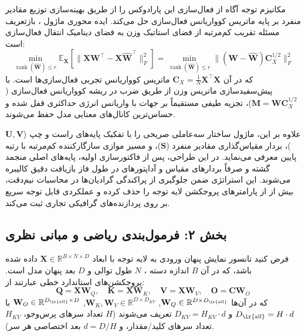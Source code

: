 مکانیزم توجه آگاه از فعال‌سازی  این پارادوکس را از طریق بهینه‌سازی توزیع مقادیر منفرد بر پایه ماتریس کوواریانس فعال‌سازی حل می‌کند. ایده محوری ماژول ، بازتعریف مسئله تقریب کم‌مرتبه از فضای استاتیک وزن به فضای دینامیک انتقال فعال‌سازی است:
\begin{equation}
\min_{\operatorname{rank}(\hat{\mathbf{W}}) \le r} \mathbb{E}_{\mathbf{X}}\left[ \|\mathbf{X}\mathbf{W}^\top - \mathbf{X}\hat{\mathbf{W}}^\top\|_F^2 \right] = \min_{\operatorname{rank}(\hat{\mathbf{W}}) \le r} \|(\mathbf{W} - \hat{\mathbf{W}})\mathbf{C}_X^{1/2}\|_F^2
\end{equation}
که در آن $\mathbf{C}_X = \frac{1}{N}\mathbf{X}^\top \mathbf{X}$ ماتریس کوواریانس تجربی فعال‌سازی‌ها است. با پیش‌سفیدسازی  ماتریس وزن از طریق ضرب در ریشه کوواریانس فعال‌سازی ($\mathbf{M} = \mathbf{W}\mathbf{C}_X^{1/2}$)، تجزیه طیفی مستقیماً بر جهات با واریانس انرژی حداکثری قفل شده و حساس‌ترین کانال‌های معنایی مدل حفظ می‌شوند.

علاوه بر این، ماژول  ساختار سه‌عاملی صریحی را با تفکیک پایه‌های راست و چپ ($\mathbf{U}, \mathbf{V}$)، بردار مقیاس‌گذاری مقادیر منفرد ($\mathbf{S}$)، و مسیر موازی سازگارکننده کم‌مرتبه با رتبه پایین  معرفی می‌نماید. در این طراحی، پس از فاکتورسازی اولیه، پایه‌های اصلی منجمد  گشته و صرفاً بردارهای مقیاس و آداپتورهای  در طول فاز بازیافت دقیق کالیبره می‌شوند. این استراتژی ضمن جلوگیری از پراکندگی گرادیان‌ها در محاسبات نیم‌دقت، بیش از  از پارامترهای پروجکشن لایه توجه را حذف کرده و عملکردی قابل توجه سریع بر روی پردازنده‌های گرافیکی تجاری ثبت می‌کند.

\subsection*{بخش ۲: فرمول‌بندی ریاضی و مبانی نظری }
فرض کنید تانسور نمایش پنهان ورودی به لایه توجه با ابعاد $\mathbf{X} \in \mathbb{R}^{B \times N \times D}$ داده شده باشد، که در آن $B$ اندازه دسته ، $N$ طول توالی  و $D$ بعد پنهان مدل  است. پروجکشن‌های استاندارد خطی عبارتند از:
\begin{equation}
\mathbf{Q} = \mathbf{X}\mathbf{W}_Q, \quad \mathbf{K} = \mathbf{X}\mathbf{W}_K, \quad \mathbf{V} = \mathbf{X}\mathbf{W}_V, \quad \mathbf{O} = \mathbf{C}\mathbf{W}_O
\end{equation}
که در آن‌ها $\mathbf{W}_Q \in \mathbb{R}^{D \times D_{\text{\lr{all}}}}$, $\mathbf{W}_K, \mathbf{W}_V \in \mathbb{R}^{D \times D_{KV}}$, $\mathbf{W}_O \in \mathbb{R}^{D_{\text{\lr{all}}} \times D}$ با $D_{\text{\lr{all}}} = H \cdot d$ و $D_{KV} = H_{KV} \cdot d$ تعریف می‌شوند ($H$ تعداد سرهای پرس‌وجو، $H_{KV}$ تعداد سرهای کلید/مقدار، و $d = D/H$ بعد اختصاصی هر سر).

